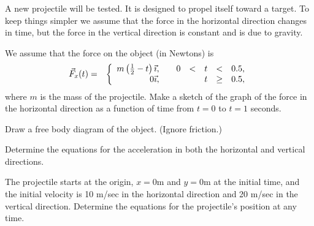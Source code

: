 \begin{problem}
\item A new projectile will be tested. It is designed to propel itself
  toward a target. To keep things simpler we assume that the force
  in the horizontal direction changes in time, but the force in the
  vertical direction is constant and is due to gravity.
  \begin{subproblem}
  \item We assume that the force on the object (in Newtons) is
      \begin{eqnarray*}
        \vec{F}_x(t) & = & \left\{
                     \begin{array}{r@{\hspace{2em}}rcccl}
                       m\left(\frac{1}{2}-t\right) \vec{\imath}, & 0 & < & t & < & 0.5, \\
                       0 \vec{\imath},        &   &   & t & \geq & 0.5,
                     \end{array}
                     \right.
      \end{eqnarray*}
      where $m$ is the mass of the projectile.  Make a sketch of the
      graph of the force in the horizontal direction as a function of
      time from $t=0$ to $t=1$ seconds.

      \vfill

    \item Draw a free body diagram of the object. (Ignore friction.)
      \vfill

    \item Determine the equations for the acceleration in both the
      horizontal and vertical directions.

      \vfill

      \clearpage

    \item The projectile starts at the origin, $x=0$m and $y=0$m at
      the initial time, and the initial velocity is 10 m/sec in the
      horizontal direction and 20 m/sec in the vertical
      direction. Determine the equations for the projectile's position
      at any time.

      \vfill

  \end{subproblem}

  \clearpage


\end{problem}

